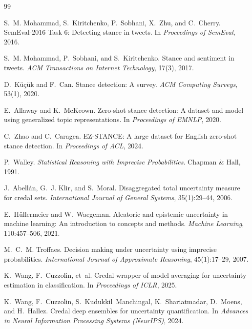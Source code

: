 \documentclass[11pt,a4paper]{article}
\begin{document}
\begin{thebibliography}{99}
\small

S.~M. Mohammad, S.~Kiritchenko, P.~Sobhani, X.~Zhu, and C.~Cherry.
\newblock SemEval-2016 Task 6: Detecting stance in tweets.
\newblock In \emph{Proceedings of SemEval}, 2016.

S.~M. Mohammad, P.~Sobhani, and S.~Kiritchenko.
\newblock Stance and sentiment in tweets.
\newblock \emph{ACM Transactions on Internet Technology}, 17(3), 2017.

D.~K{\"u}{\c{c}}{\"u}k and F.~Can.
\newblock Stance detection: A survey.
\newblock \emph{ACM Computing Surveys}, 53(1), 2020.

E.~Allaway and K.~McKeown.
\newblock Zero-shot stance detection: A dataset and model using generalized topic representations.
\newblock In \emph{Proceedings of EMNLP}, 2020.

C.~Zhao and C.~Caragea.
\newblock EZ-STANCE: A large dataset for English zero-shot stance detection.
\newblock In \emph{Proceedings of ACL}, 2024.

P.~Walley.
\newblock \emph{Statistical Reasoning with Imprecise Probabilities}.
\newblock Chapman \& Hall, 1991.

J.~Abell{\'a}n, G.~J. Klir, and S.~Moral.
\newblock Disaggregated total uncertainty measure for credal sets.
\newblock \emph{International Journal of General Systems}, 35(1):29--44, 2006.

E.~H{\"u}llermeier and W.~Waegeman.
\newblock Aleatoric and epistemic uncertainty in machine learning: An introduction to concepts and methods.
\newblock \emph{Machine Learning}, 110:457--506, 2021.

M.~C.~M. Troffaes.
\newblock Decision making under uncertainty using imprecise probabilities.
\newblock \emph{International Journal of Approximate Reasoning}, 45(1):17--29, 2007.

K.~Wang, F.~Cuzzolin, et~al.
\newblock Credal wrapper of model averaging for uncertainty estimation in classification.
\newblock In \emph{Proceedings of ICLR}, 2025.

K.~Wang, F.~Cuzzolin, S.~Kudukkil~Manchingal, K.~Shariatmadar, D.~Moens, and H.~Hallez.
\newblock Credal deep ensembles for uncertainty quantification.
\newblock In \emph{Advances in Neural Information Processing Systems (NeurIPS)}, 2024.


\end{thebibliography}
\end{document}
